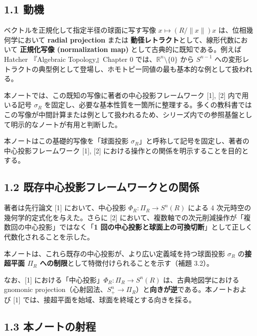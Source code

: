 \documentclass[
]{ltjsarticle}
\begin{document}
\subsection{1.1 動機}\label{ux52d5ux6a5f}

ベクトルを正規化して指定半径の球面に写す写像 \(x \mapsto (R/\|x\|) x\)
は、位相幾何学において \textbf{radial projection} または
\textbf{動径レトラクト}として、線形代数において \textbf{正規化写像
(normalization map)} として古典的に既知である。例えば Hatcher
『Algebraic Topology』Chapter 0 では、\(\mathbb{R}^n \setminus \{0\}\)
から \(S^{n-1}\)
への変形レトラクトの典型例として登場し、ホモトピー同値の最も基本的な例として扱われる。

本ノートでは、この既知の写像に著者の中心投影フレームワーク {[}1{]},
{[}2{]} 内で用いる記号 \(\sigma_R\)
を固定し、必要な基本性質を一箇所に整理する。多くの教科書ではこの写像が中間計算または例として扱われるため、シリーズ内での参照基盤として明示的なノートが有用と判断した。

本ノートはこの基礎的写像を「球面投影
\(\sigma_R\)」と呼称して記号を固定し、著者の中心投影フレームワーク
{[}1{]}, {[}2{]} における操作との関係を明示することを目的とする。

\subsection{1.2
既存中心投影フレームワークとの関係}\label{ux65e2ux5b58ux4e2dux5fc3ux6295ux5f71ux30d5ux30ecux30fcux30e0ux30efux30fcux30afux3068ux306eux95a2ux4fc2}

著者は先行論文 {[}1{]} において、中心投影 \(\Phi_R: \Pi_R \to S^n(R)\)
による 4 次元時空の幾何学的定式化を与えた。さらに {[}2{]}
において、複数軸での次元削減操作が「複数回の中心投影」ではなく「\textbf{1
回の中心投影と球面上の可換切断}」として正しく代数化されることを示した。

本ノートは、これら既存の中心投影が、より広い定義域を持つ球面投影
\(\sigma_R\) の\textbf{接超平面 \(\Pi_R\)
への制限}として特徴付けられることを示す（補題 3.2）。

なお、{[}1{]} における「中心投影」\(\Phi_R: \Pi_R \to S^n(R)\)
は、古典地図学における gnomonic
projection（心射図法、\(S^n_+ \to \Pi_R\)）と\textbf{向きが逆}である。本ノートおよび
{[}1{]} では、接超平面を始域、球面を終域とする向きを採る。

\subsection{1.3
本ノートの射程}\label{ux672cux30ceux30fcux30c8ux306eux5c04ux7a0b}
\end{document}
